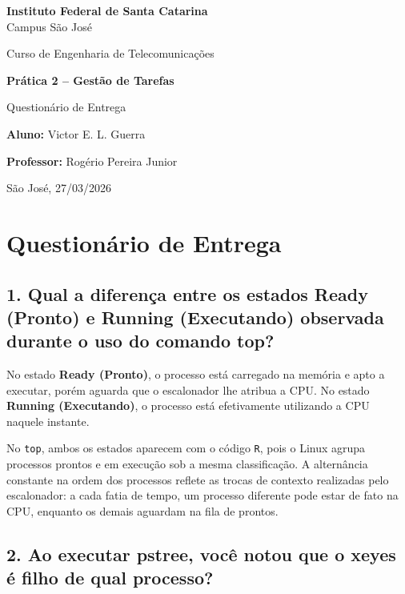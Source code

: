 \documentclass[12pt,a4paper]{article}
\newcommand{\aluno}{Victor E. L. Guerra}
\newcommand{\dataPratica}{27/03/2026}
\begin{document}
\begin{titlepage}
\centering
\vspace*{2cm}
{\Large\textbf{Instituto Federal de Santa Catarina}\\Campus São José\par}
\vspace{0.5cm}
{\large Curso de Engenharia de Telecomunicações\par}
\vspace{3cm}
{\LARGE\textbf{Prática 2 -- Gestão de Tarefas}\par}
\vspace{0.5cm}
{\large Questionário de Entrega\par}
\vspace{3cm}
{\large\textbf{Aluno:} \aluno\par}
\vspace{0.5cm}
{\large\textbf{Professor:} Rogério Pereira Junior\par}
\vspace{3cm}
{\large São José, \dataPratica\par}
\end{titlepage}

\section*{Questionário de Entrega}

\subsection*{1. Qual a diferença entre os estados Ready (Pronto) e Running (Executando) observada durante o uso do comando top?}

No estado \textbf{Ready (Pronto)}, o processo está carregado na memória e apto a executar, porém aguarda que o escalonador lhe atribua a CPU. No estado \textbf{Running (Executando)}, o processo está efetivamente utilizando a CPU naquele instante.

No \texttt{top}, ambos os estados aparecem com o código \texttt{R}, pois o Linux agrupa processos prontos e em execução sob a mesma classificação. A alternância constante na ordem dos processos reflete as trocas de contexto realizadas pelo escalonador: a cada fatia de tempo, um processo diferente pode estar de fato na CPU, enquanto os demais aguardam na fila de prontos.

\subsection*{2. Ao executar pstree, você notou que o xeyes é filho de qual processo?}
\end{document}
